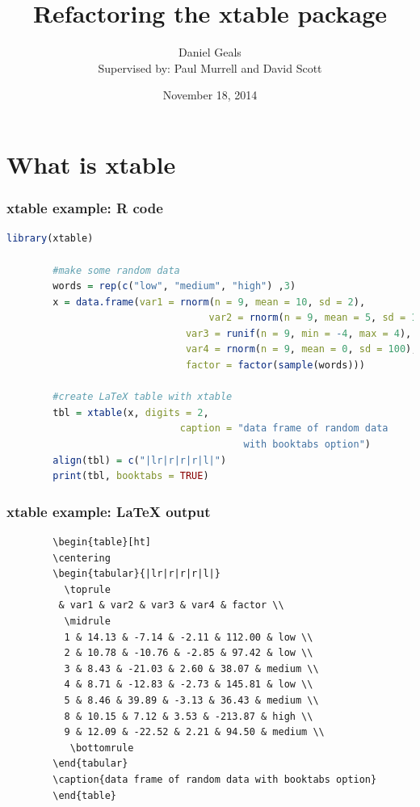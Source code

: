 \documentclass{beamer}
\title{Refactoring the {\bfseries xtable} package}
\author[Daniel Geals]{Daniel Geals\\{\small Supervised by: Paul Murrell and David Scott}}
\date{November 18, 2014}
\begin{document}
\begin{frame}
\titlepage
\end{frame}

\section{What is {\bfseries xtable}}

\begin{frame}[fragile]
\frametitle{{\bfseries xtable} example: R code}
		\begin{lstlisting}[language=R]
		library(xtable)
		
		#make some random data
		words = rep(c("low", "medium", "high") ,3)
		x = data.frame(var1 = rnorm(n = 9, mean = 10, sd = 2),
					   	           var2 = rnorm(n = 9, mean = 5, sd = 15),
			       		       var3 = runif(n = 9, min = -4, max = 4),
			       		       var4 = rnorm(n = 9, mean = 0, sd = 100),
			       		       factor = factor(sample(words)))
		
		#create LaTeX table with xtable
		tbl = xtable(x, digits = 2, 
		  			          caption = "data frame of random data 
		  			                     with booktabs option")
		align(tbl) = c("|lr|r|r|r|l|")
		print(tbl, booktabs = TRUE)
		\end{lstlisting}
\end{frame}

\begin{frame}[fragile]
\frametitle{{\bfseries xtable} example: LaTeX output}
		\begin{lstlisting}
		\begin{table}[ht]
		\centering
		\begin{tabular}{|lr|r|r|r|l|}
		  \toprule
		 & var1 & var2 & var3 & var4 & factor \\ 
		  \midrule
		  1 & 14.13 & -7.14 & -2.11 & 112.00 & low \\ 
		  2 & 10.78 & -10.76 & -2.85 & 97.42 & low \\ 
		  3 & 8.43 & -21.03 & 2.60 & 38.07 & medium \\ 
		  4 & 8.71 & -12.83 & -2.73 & 145.81 & low \\ 
		  5 & 8.46 & 39.89 & -3.13 & 36.43 & medium \\  
		  8 & 10.15 & 7.12 & 3.53 & -213.87 & high \\ 
		  9 & 12.09 & -22.52 & 2.21 & 94.50 & medium \\ 
		   \bottomrule
		\end{tabular}
		\caption{data frame of random data with booktabs option} 
		\end{table}
		\end{lstlisting}
\end{frame}
\end{document}

